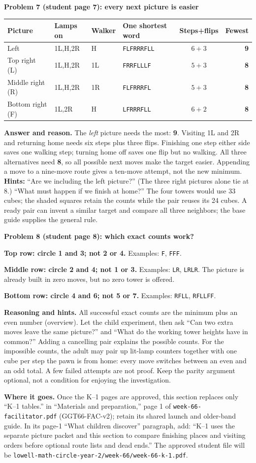 \documentclass[11pt]{article}
\makeatletter
\newcommand{\sub}[1]{\par\textbf{#1}\par}
\newcommand{\keyrow}[8]{#2 & #3 & #4 & \texttt{#5} & $#6+#7$ & \textbf{#8}\\}
\newcommand{\exactword}[2]{\texttt{#2}}
\newenvironment{keytable}{\par\smallskip\begingroup\small\setlength{\tabcolsep}{7pt}\renewcommand{\arraystretch}{1.15}\begin{tabular}{@{}llllcr@{}}\textbf{Picture}&\textbf{Lamps on}&\textbf{Walker}&\textbf{One shortest word}&\textbf{Steps+flips}&\textbf{Fewest}\\\midrule}{\end{tabular}\endgroup\par\smallskip}
\makeatother
\begin{document}
\sub{Problem 7 (student page 7): every next picture is easier}
\begin{keytable}
\keyrow{7start}{Left}{1L,H,2R}{H}{FLFRRRFLL}{6}{3}{9}
\keyrow{7L}{Top right (L)}{1L,H,2R}{1L}{FRRFLLLF}{5}{3}{8}
\keyrow{7R}{Middle right (R)}{1L,H,2R}{1R}{FLFRRRFL}{5}{3}{8}
\keyrow{7F}{Bottom right (F)}{1L,2R}{H}{LFRRRFLL}{6}{2}{8}
\end{keytable}
\textbf{Answer and reason.} The \emph{left} picture needs the most: \textbf{9}. Visiting 1L and 2R and returning home needs six steps plus three flips. Finishing one step either side saves one walking step; turning home off saves one flip but no walking. All three alternatives need \textbf{8}, so all possible next moves make the target easier. Appending a move to a nine-move route gives a ten-move attempt, not the new minimum.
\textbf{Hints:} ``Are we including the left picture?'' (The three right pictures alone tie at 8.) ``What must happen if we finish at home?'' The four towers would use 33 cubes; the shaded squares retain the counts while the pair reuses its 24 cubes. A ready pair can invent a similar target and compare all three neighbors; the base guide supplies the general rule.

\sub{Problem 8 (student page 8): which exact counts work?}
\textbf{Top row: circle 1 and 3; not 2 or 4.} Examples: \exactword{8top}{F}, \exactword{8top}{FFF}.\par
\textbf{Middle row: circle 2 and 4; not 1 or 3.} Examples: \exactword{8middle}{LR}, \exactword{8middle}{LRLR}. The picture is already built in zero moves, but no zero tower is offered.\par
\textbf{Bottom row: circle 4 and 6; not 5 or 7.} Examples: \exactword{8bottom}{RFLL}, \exactword{8bottom}{RFLLFF}.

\textbf{Reasoning and hints.} All successful exact counts are the minimum plus an even number (overview). Let the child experiment, then ask ``Can two extra moves leave the same picture?'' and ``What do the working tower heights have in common?'' Adding a cancelling pair explains the possible counts. For the impossible counts, the adult may pair up lit-lamp counters together with one cube per step the pawn is from home: every move switches between an even and an odd total. A few failed attempts are not proof. Keep the parity argument optional, not a condition for enjoying the investigation.

\textbf{Where it goes.} Once the K--1 pages are approved, this section replaces only ``K--1 tables.'' in ``Materials and preparation,'' page 1 of \texttt{week-66-facilitator.pdf} (GGT66-FAC-v2); retain its shared launch and older-band guide. In its page-1 ``What children discover'' paragraph, add: ``K--1 uses the separate picture packet and this section to compare finishing places and visiting orders before optional route lists and dead ends.'' The approved student file will be \texttt{lowell-math-circle-year-2/}\allowbreak\texttt{week-66/week-66-k-1.pdf}.
\end{document}

